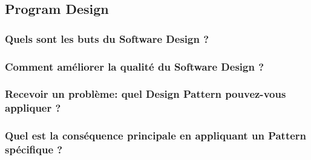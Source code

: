 \subsection{Program Design}



\subsubsection{Quels sont les buts du Software Design ?}



\subsubsection{Comment améliorer la qualité du Software Design ?}



\subsubsection{Recevoir un problème: quel Design Pattern pouvez-vous appliquer ?}



\subsubsection{Quel est la conséquence principale en appliquant un Pattern spécifique ?}